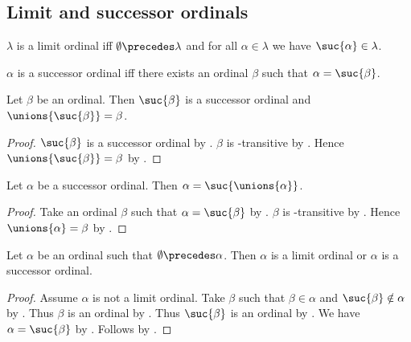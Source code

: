 \subsection{Limit and successor ordinals}


\begin{definition}\label{limit_ordinal}
    $\lambda$ is a limit ordinal iff
    $\emptyset\precedes \lambda$ %
    and for all $\alpha\in \lambda$ we have $\suc{\alpha}\in \lambda$.
\end{definition}

\begin{definition}\label{successor_ordinal}
    $\alpha$ is a successor ordinal iff
    there exists an ordinal $\beta$ such that $\alpha = \suc{\beta}$.
\end{definition}

\begin{lemma}\label{ordinal_successor_data}
    Let $\beta$ be an ordinal.
    Then $\suc{\beta}$ is a successor ordinal and
        $\unions{\suc{\beta}}=\beta$.
\end{lemma}
\begin{proof}
    $\suc{\beta}$ is a successor ordinal by
        .
    $\beta$ is \in-transitive by
        .
    Hence $\unions{\suc{\beta}}=\beta$ by
        .
\end{proof}

\begin{lemma}\label{successor_ordinal_eq_suc_unions}
    Let $\alpha$ be a successor ordinal.
    Then $\alpha=\suc{\unions{\alpha}}$.
\end{lemma}
\begin{proof}
    Take an ordinal $\beta$ such that $\alpha=\suc{\beta}$ by
        .
    $\beta$ is \in-transitive by
        .
    Hence $\unions{\alpha}=\beta$ by
        .
\end{proof}

\begin{lemma}\label{positive_ordinal_is_limit_or_successor}
    Let $\alpha$ be an ordinal such that $\emptyset\precedes\alpha$.
    Then $\alpha$ is a limit ordinal or $\alpha$ is a successor ordinal.
\end{lemma}
\begin{proof}
    Assume $\alpha$ is not a limit ordinal.
    Take $\beta$ such that $\beta\in\alpha$ and $\suc{\beta}\notin\alpha$
        by .
    Thus $\beta$ is an ordinal by .
    Thus $\suc{\beta}$ is an ordinal by .
    We have $\alpha=\suc{\beta}$
        by .
    Follows by .
\end{proof}

